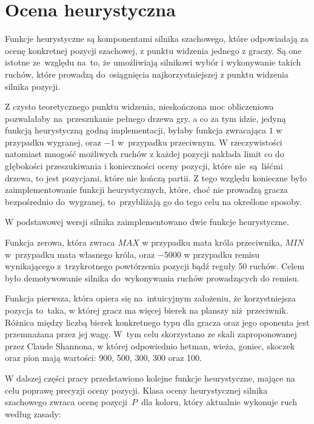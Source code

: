 \section{Ocena heurystyczna}
\label{sec:ocena-heurystyczna}

Funkcje heurystyczne są komponentami silnika szachowego, które odpowiadają za ocenę konkretnej pozycji szachowej, z punktu widzenia jednego z graczy.
Są one istotne ze~względu na~to, że umożliwiają silnikowi wybór i wykonywanie takich ruchów, które prowadzą do~osiągnięcia najkorzystniejszej z punktu widzenia silnika pozycji.

Z czysto teoretycznego punktu widzenia, nieskończona moc obliczeniowa pozwalałaby na~przeszukanie pełnego drzewa gry, a co za tym idzie, jedyną funkcją heurystyczną godną implementacji, byłaby funkcja zwracająca $1$ w przypadku wygranej, oraz $-1$ w~przypadku przeciwnym.
W rzeczywistości natomiast mnogość możliwych ruchów z każdej pozycji nakłada limit co do głębokości przeszukiwania i konieczności oceny pozycji, które nie~są~liśćmi drzewa, to jest pozycjami, które nie kończą partii.
Z tego względu konieczne było zaimplementowanie funkcji heurystycznych, które, choć nie prowadzą gracza bezpośrednio do~wygranej, to~przybliżają go do tego celu na określone sposoby.

W podstawowej wersji silnika zaimplementowano dwie funkcje heurystyczne.

Funkcja zerowa, która zwraca $MAX$ w przypadku mata króla przeciwnika, $MIN$ w~przypadku mata własnego króla, oraz $-5000$ w przypadku remisu wynikającego z~trzykrotnego powtórzenia pozycji bądź reguły 50 ruchów.
Celem było demotywowanie silnika do~wykonywania ruchów prowadzących do remisu.

Funkcja pierwsza, która opiera się na~intuicyjnym założeniu, że korzystniejsza pozycja to~taka, w której gracz ma więcej bierek na planszy niż~przeciwnik.
Różnica między liczbą bierek konkretnego typu dla gracza oraz jego oponenta jest przemnażana przez jej wagę.
W~tym celu skorzystano ze skali zaproponowanej przez Claude Shannona, w której odpowiednio hetman, wieża, goniec, skoczek oraz pion mają wartości: 900, 500, 300, 300 oraz 100.

W dalszej części pracy przedstawiono kolejne funkcje heurystyczne, mające na celu poprawę precyzji oceny pozycji.
Klasa oceny heurystycznej silnika szachowego zwraca ocenę pozycji~$P$~dla koloru, który aktualnie wykonuje ruch według zasady:

